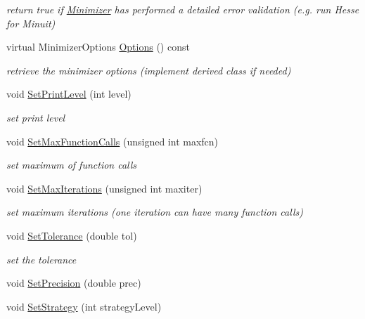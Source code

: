 \begin{DoxyCompactItemize}
\begin{DoxyCompactList}\small\item\em return true if \mbox{\hyperlink{classROOT_1_1Math_1_1Minimizer}{Minimizer}} has performed a detailed error validation (e.\+g. run Hesse for Minuit) \end{DoxyCompactList}\item 
virtual Minimizer\+Options \mbox{\hyperlink{classROOT_1_1Math_1_1Minimizer_a9b0653bcf3d2c0b4df79c1db2068ff27}{Options}} () const
\begin{DoxyCompactList}\small\item\em retrieve the minimizer options (implement derived class if needed) \end{DoxyCompactList}\item 
void \mbox{\hyperlink{classROOT_1_1Math_1_1Minimizer_a726ee3c159360784a2d76f0b9e9594a6}{Set\+Print\+Level}} (int level)
\begin{DoxyCompactList}\small\item\em set print level \end{DoxyCompactList}\item 
void \mbox{\hyperlink{classROOT_1_1Math_1_1Minimizer_aabbadaa76bb5723fcaec0eb7d40850b2}{Set\+Max\+Function\+Calls}} (unsigned int maxfcn)
\begin{DoxyCompactList}\small\item\em set maximum of function calls \end{DoxyCompactList}\item 
void \mbox{\hyperlink{classROOT_1_1Math_1_1Minimizer_a1aa272e578cdf2af1b80cc641ce6c58c}{Set\+Max\+Iterations}} (unsigned int maxiter)
\begin{DoxyCompactList}\small\item\em set maximum iterations (one iteration can have many function calls) \end{DoxyCompactList}\item 
void \mbox{\hyperlink{classROOT_1_1Math_1_1Minimizer_a5b7ee47a24b2412801654b8cde2c9b4f}{Set\+Tolerance}} (double tol)
\begin{DoxyCompactList}\small\item\em set the tolerance \end{DoxyCompactList}\item 
void \mbox{\hyperlink{classROOT_1_1Math_1_1Minimizer_a96160fe12f3cddf6ca0668ddb4a585bc}{Set\+Precision}} (double prec)
\item 
void \mbox{\hyperlink{classROOT_1_1Math_1_1Minimizer_a86a1145e00a7912ac061bad0e11b6c0b}{Set\+Strategy}} (int strategy\+Level)

\end{DoxyCompactItemize}
